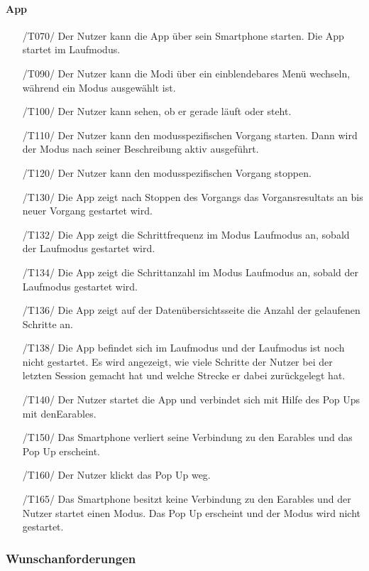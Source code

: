 \documentclass[a4paper,12pt]{article}
\begin{document}
  \paragraph{App}
    \begin{itemize}
    \item[/T070/] Der Nutzer kann die App über sein Smartphone starten. Die App startet im Laufmodus.
    \item[/T090/] Der Nutzer kann die Modi über ein einblendebares Menü wechseln, während ein Modus ausgewählt ist.
    \item[/T100/] Der Nutzer kann sehen, ob er gerade \glqq läuft\grqq{} oder \glqq steht\grqq{}.
    \item[/T110/] Der Nutzer kann den modusspezifischen \Gls{Vorgang} starten. Dann wird der Modus nach seiner Beschreibung aktiv ausgeführt.
    \item[/T120/] Der Nutzer kann den modusspezifischen \Gls{Vorgang} stoppen.
    \item[/T130/] Die App zeigt nach Stoppen des Vorgangs das Vorgansresultats an bis neuer \Gls{Vorgang} gestartet wird.
    \item[/T132/] Die App zeigt die \gls{Schrittfrequenz} im Modus \glqq{}Laufmodus\grqq{} an, sobald der Laufmodus gestartet wird.
    \item[/T134/] Die App zeigt die Schrittanzahl im Modus \glqq{}Laufmodus\grqq{} an, sobald der Laufmodus gestartet wird.
    \item[/T136/] Die App zeigt auf der Datenübersichtsseite die Anzahl der gelaufenen Schritte an.
    \item[/T138/] Die App befindet sich im Laufmodus und der Laufmodus ist noch nicht gestartet. Es wird angezeigt, wie viele Schritte der Nutzer bei der letzten Session gemacht hat und welche Strecke er dabei zurückgelegt hat.
    \item[/T140/] Der Nutzer startet die App und verbindet sich mit Hilfe des Pop Ups mit den\gls{Earables}.
    \item[/T150/] Das Smartphone verliert seine Verbindung zu den \gls{Earables} und das Pop Up erscheint.
    \item[/T160/] Der Nutzer klickt das Pop Up weg.
    \item[/T165/] Das Smartphone besitzt keine Verbindung zu den \gls{Earables} und der Nutzer startet einen Modus. Das Pop Up erscheint und der Modus wird nicht gestartet.
  \end{itemize}

\subsubsection{Wunschanforderungen}
\end{document}
